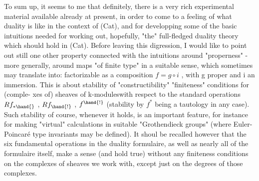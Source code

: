 To sum up, it seems to me that definitely, there is a very rich
experimental material available already at present, in order to come
to a feeling of what duality is like in the context of (Cat), and 
for developping some of the basic intuitions needed for working out,
hopefully\xout{\unsure{,}}, "the" full-fledged duality theory which should hold in
(Cat). Before leaving this digression, I would like to point out still
one  other property connected with the  intuitions around
"properness" - more generally, around maps "of finite type" in a
suitable sense, which sometimes may translate into: factorizable as
a composition $f = g\circ i$ , with g proper and i an immersion. This is about
stability of "constructibility"  "finiteness" conditions for (comple-%
xes of) sheaves of k-modules\hand{,}with respect to the standard operations
$Rf_{*\hand{}}$ , $Rf_{\hand{!}}$ , $f^{\hand{!}}$ (stability by $f^{*}$ being a tautology in any case). Such
stability of course, whenever it holds, is an important feature,
for instance for making "virtual" calculations in suitable "Grothendieck
groups" (where Euler-Poincaré type invariants may be defined). It shoul
be recalled however that the six fundamental operations in the duality
formulaire, as well as nearly all of the formulaire itself, make a
sense (and  hold true) without any finiteness conditions on the complexes
of sheaves we work with, except just   on the degrees
of those complexes.

